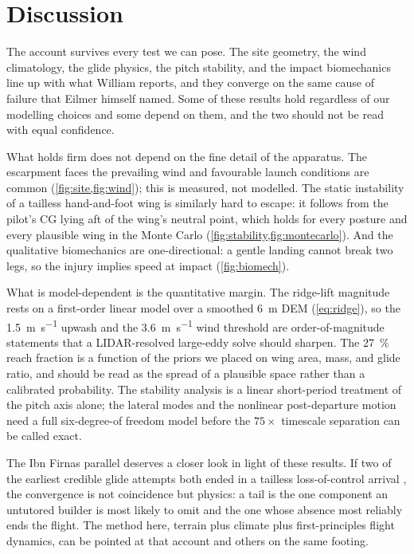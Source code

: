 \section{Discussion}

The account survives every test we can pose.
The site geometry, the wind climatology, the glide physics, the pitch stability, and
the impact biomechanics line up with what William reports, and they converge on the
same cause of failure that Eilmer himself named.
Some of these results hold regardless of our modelling choices and some depend on
them, and the two should not be read with equal confidence.

What holds firm does not depend on the fine detail of the apparatus.
The escarpment faces the prevailing wind and favourable launch conditions are common
(\cref{fig:site,fig:wind}); this is measured, not modelled.
The static instability of a tailless hand-and-foot wing is similarly hard to escape:
it follows from the pilot's CG lying aft of the wing's neutral point, which holds for
every posture and every plausible wing in the Monte Carlo
(\cref{fig:stability,fig:montecarlo}).
And the qualitative biomechanics are one-directional: a gentle landing cannot break
two legs, so the injury implies speed at impact (\cref{fig:biomech}).

What is model-dependent is the quantitative margin.
The ridge-lift magnitude rests on a first-order linear model over a smoothed
\SI{6}{\meter} DEM (\cref{eq:ridge}), so the \SI{1.5}{\meter\per\second} upwash and
the \SI{3.6}{\meter\per\second} wind threshold are order-of-magnitude statements that
a LIDAR-resolved large-eddy solve should sharpen.
The \SI{27}{\percent} reach fraction is a function of the priors we placed on wing
area, mass, and glide ratio, and should be read as the spread of a plausible space
rather than a calibrated probability.
The stability analysis is a linear short-period treatment of the pitch axis alone;
the lateral modes and the nonlinear post-departure motion need a full six-degree-of
freedom model before the \(75\times\) timescale separation can be called exact.

The Ibn Firnas parallel deserves a closer look in light of these results.
If two of the earliest credible glide attempts both ended in a tailless
loss-of-control arrival \autocite{anderson2024bridge}, the convergence is not
coincidence but physics: a tail is the one component an untutored builder is most
likely to omit and the one whose absence most reliably ends the flight.
The method here, terrain plus climate plus first-principles flight dynamics, can be
pointed at that account and others on the same footing.

